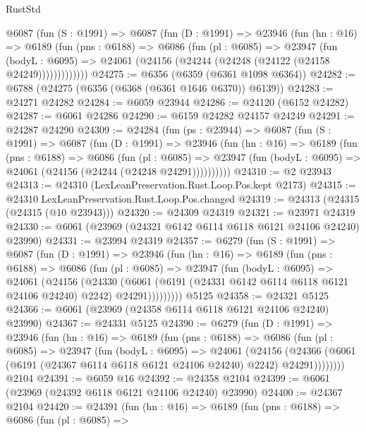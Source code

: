 \begin{lexlean}{RustStd}
\begin{coremodule}
{\begin{coremodule}
{{{{{{{{{{{{{{{{{{{{{{{{{{      @6087
        (fun (S : @1991) =>
        @6087
          (fun (D : @1991) =>
          @23946
            (fun (hn : @16) =>
            @6189
              (fun (pns : @6188) =>
              @6086
                (fun (pl : @6085) =>
                @23947
                  (fun (bodyL : @6095) =>
                  @24061 (@24156 (@24244 (@24248 (@24122 (@24158 @24249)))))))))))))
@24275 := @6356 (@6359 (@6361 @1098 @6364))
@24282 := @6788 (@24275 (@6356 (@6368 (@6361 @1646 @6370)) @6139))
@24283 := @24271 @24282
@24284 := @6059 @23944
@24286 := @24120 (@6152 @24282)
@24287 := @6061 @24286
@24290 := @6159 @24282 @24157 @24249
@24291 := @24287 @24290
@24309 := @24284
    (fun (ps : @23944) =>
    @6087
      (fun (S : @1991) =>
      @6087
        (fun (D : @1991) =>
        @23946
          (fun (hn : @16) =>
          @6189
            (fun (pns : @6188) =>
            @6086
              (fun (pl : @6085) =>
              @23947 (fun (bodyL : @6095) => @24061 (@24156 (@24244 (@24248 @24291))))))))))
@24310 := @2 @23943
@24313 := @24310 (LexLeanPreservation.Rust.Loop.Pos.kept @2173)
@24315 := @24310 LexLeanPreservation.Rust.Loop.Pos.changed
@24319 := @24313 (@24315 (@24315 (@10 @23943)))
@24320 := @24309 @24319
@24321 := @23971 @24319
@24330 := @6061 (@23969 (@24321 @6142 @6114 @6118 @6121 @24106 @24240) @23990)
@24331 := @23994 @24319
@24357 := @6279
    (fun (S : @1991) =>
    @6087
      (fun (D : @1991) =>
      @23946
        (fun (hn : @16) =>
        @6189
          (fun (pns : @6188) =>
          @6086
            (fun (pl : @6085) =>
            @23947
              (fun (bodyL : @6095) =>
              @24061
                (@24156
                  (@24330
                    (@6061
                      (@6191 (@24331 @6142 @6114 @6118 @6121 @24106 @24240) @2242)
                      @24291)))))))))
    @5125
@24358 := @24321 @5125
@24366 := @6061 (@23969 (@24358 @6114 @6118 @6121 @24106 @24240) @23990)
@24367 := @24331 @5125
@24390 := @6279
    (fun (D : @1991) =>
    @23946
      (fun (hn : @16) =>
      @6189
        (fun (pns : @6188) =>
        @6086
          (fun (pl : @6085) =>
          @23947
            (fun (bodyL : @6095) =>
            @24061
              (@24156
                (@24366 (@6061 (@6191 (@24367 @6114 @6118 @6121 @24106 @24240) @2242) @24291))))))))
    @2104
@24391 := @6059 @16
@24392 := @24358 @2104
@24399 := @6061 (@23969 (@24392 @6118 @6121 @24106 @24240) @23990)
@24400 := @24367 @2104
@24420 := @24391
    (fun (hn : @16) =>
    @6189
      (fun (pns : @6188) =>
      @6086
        (fun (pl : @6085) =>
}}}}}}}}}}}}}}}}}}}}}}}}}}
\end{coremodule}}
\end{coremodule}
\end{lexlean}
